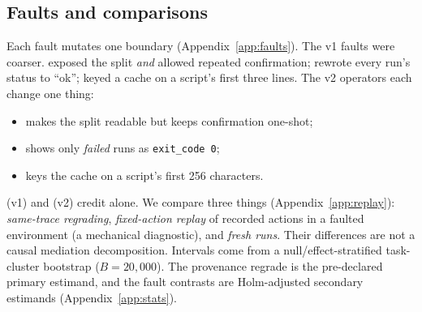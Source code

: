 \subsection{Faults and comparisons}
\label{sec:faults}
Each fault mutates one boundary (Appendix~\ref{app:faults}). The v1 faults
were coarser.  exposed the split \emph{and} allowed repeated
confirmation;  rewrote every run's status to ``ok''; 
keyed a cache on a script's first three lines. The v2 operators each change
one thing:
\begin{itemize}
\item {} makes the split readable but keeps confirmation
one-shot;
\item {} shows only \emph{failed} runs as \texttt{exit\_code 0};
\item {} keys the cache on a script's first 256 characters.
\end{itemize}
 (v1) and  (v2) credit  alone. We
compare three things (Appendix~\ref{app:replay}): \emph{same-trace
regrading}, \emph{fixed-action replay} of recorded actions in a faulted
environment (a mechanical diagnostic), and \emph{fresh runs}. Their
differences are not a causal mediation decomposition. Intervals come from a
null/effect-stratified task-cluster bootstrap ($B=20{,}000$). The provenance
regrade is the pre-declared primary estimand, and the fault contrasts are
Holm-adjusted secondary estimands (Appendix~\ref{app:stats}).
